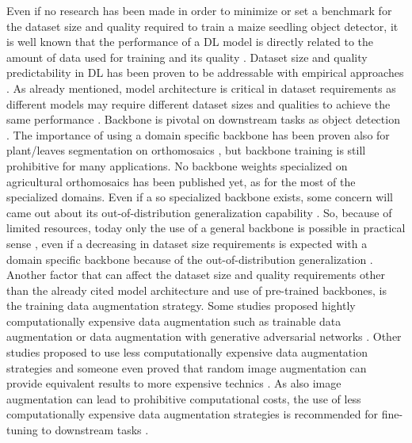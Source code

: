\documentclass[journal,article,submit,pdftex,moreauthors]{Definitions/mdpi}
\begin{document}
Even if no research has been made in order to minimize or set a benchmark for the dataset size and quality
required to train a maize seedling object detector,
it is well known that the performance of a DL model is directly related to the
amount of data used for training \cite{sunRevisitingUnreasonableEffectiveness2017} and 
its quality \cite{alhazmiEffectsAnnotationQuality2021}.
Dataset size and quality predictability in DL has been proven to be
addressable with empirical approaches \cite{hestnessDeepLearningScaling2017,mahmoodHowMuchMore2022}.
As already mentioned, model architecture is critical in dataset requirements as different models may require
different dataset sizes and qualities to achieve the same performance \cite{nguyenEvaluationDeepLearning2020,brigatoCloseLookDeep2020}.
Backbone is pivotal on downstream tasks as object detection \cite{duSpineNetLearningScalePermuted2020}. 
The importance of using a domain specific backbone has been proven also
for plant/leaves segmentation on orthomosaics \cite{roggiolaniDomainSpecificPreTraining2023},
but backbone training is still prohibitive for many applications.
No backbone weights specialized on agricultural orthomosaics has been published yet,
as for the most of the specialized domains. Even if a so specialized backbone exists,
some concern will came out about its out-of-distribution generalization capability \cite{hendrycksManyFacesRobustness2020}.
So, because of limited resources, today only the use of a general backbone is 
possible in practical sense \cite{jeevanWhichBackboneUse2024},
even if a decreasing in dataset size requirements is expected with a domain specific 
backbone because of the out-of-distribution generalization \cite{goldblumBattleBackbonesLargeScale2023}.
Another factor that can affect the dataset size and quality requirements other than 
the already cited model architecture and use of pre-trained backbones, is the training data
augmentation strategy. Some studies proposed hightly computationally expensive data augmentation
such as trainable data augmentation \cite{cubukAutoAugmentLearningAugmentation2019} or
data augmentation with generative adversarial networks \cite{antoniouDataAugmentationGenerative2018}.
Other studies proposed to use less computationally expensive data augmentation strategies
\cite{shortenSurveyImageData2019,chadebecDataAugmentationVariational2021} and someone
even proved that random image augmentation can provide equivalent results to more
expensive technics \cite{mullerTrivialAugmentTuningfreeStateoftheArt2021}.
As also image augmentation can lead to prohibitive computational costs, the use of
less computationally expensive data augmentation strategies is recommended for
fine-tuning to downstream tasks \cite{shortenSurveyImageData2019}.
\end{document}
